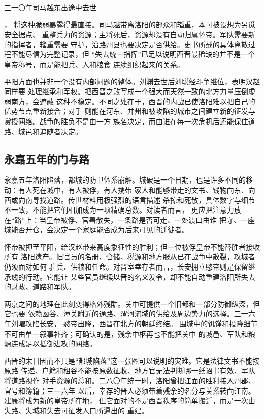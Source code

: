 \hypertarget{evt:JH-0310-SIMA-YUE-DEATH}{\textcolor{dynasty}{三一〇年司马越东出途中去世}}，
将这种脆弱暴露得最直接。司马越带离洛阳的部众和辎重，本可被设想为另觅安全据点、
重整兵力的资源；主将死后，资源却没有自动归属怀帝。军队需要新的指挥者，辎重需要
守护，沿路州县也要决定是否供给。史书所载的具体离散过程不能尽信为完整记录，但
“失去统一指挥”已足以说明西晋最稀缺的并不是一个皇帝称号，而是能把兵、人和粮食
连续组织起来的关系。

平阳方面也并非一个没有内部问题的整体。刘渊去世后刘聪经斗争继位，表明汉赵同样要
处理继承和军权。把西晋之败写成一个强大而天然一致的北方力量压倒虚弱南方，会遮蔽
这种不稳定。不同之处在于，西晋的内战已使洛阳难以把自己的优势节点重新接合；对手
则能在河东、并州和被攻陷的城市之间建立新的征发与赏授网络。战争的胜负不是由一方
族名决定，而由谁在每一次危机后还能保住道路、城邑和追随者决定。

\subsection{永嘉五年的门与路}

永嘉五年洛阳陷落，\textcolor{dynasty}{都城的防卫体系崩解}。城破是一个日期，也是许多不同的移动：有人死在城中，有人被俘，有人携带
家人和能够带走的文书、钱物向东、向西或向南寻找道路。传世材料用极强烈的语言描述
杀掠和死散，具体数字与细节不一致，不能把它们相加成为一项精确总数。对读者而言，
更应把注意力放在“路”上：当皇帝被俘、官署散失，一条路是否可走、一处渡口由谁
把守、一座城能否开仓，会决定一个家庭能否成为后来可见的迁徙者。

怀帝被押至平阳，给汉赵带来高度象征性的胜利；但一位被俘皇帝不能替胜者接收所有
洛阳遗产。旧官员的名册、仓储、税源和地方服从已在战争中散裂，攻城者仍须面对如何
驻兵、供粮和任命。对晋室幸存者而言，长安拥立愍帝则是保留继承线的行动。它能让
某些官员继续以晋的名义发令，却不能自动重建洛阳所失去的财政、道路和军队。

两京之间的地理在此刻变得格外残酷。关中可提供一个旧都和一部分防御纵深，但它也要
依赖函谷、潼关附近的通路、渭河流域的供给及周边势力的选择。三一六年刘曜攻陷长安，
\hypertarget{evt:JH-0316-CHANGAN-FALL}{\textcolor{dynasty}{愍帝出降}}，西晋在北方的朝廷终结。
围城中的饥馑和投降细节不可由单一叙事补齐；可确认的是，残余中枢再也不能把关中
的城邑、军队和粮源连成足以抵御进攻的网络。

西晋的末日因而不只是“都城陷落”这一张图可以说明的灾难。它是法律文书不能按原路
传递、户籍和租谷不能按原数征收、地方官无法判断哪一纸诏书有效、军队将道路视作
对手资源的总和。二八〇年统一时，洛阳曾把江面的胜利接入州郡、官号和簿籍；三一六年
以后，幸存的晋人必须带着残余的名分与关系转向江南。建康将成为新的皇帝所在地，
但它面对的不是西晋秩序的简单搬迁，而是一次由失路、失城和失去可征发人口所逼出的
重建。

